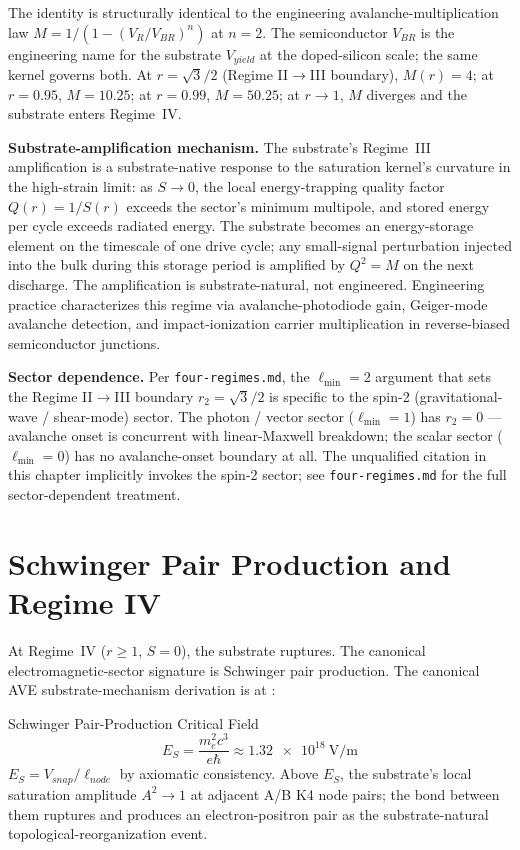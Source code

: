 The identity is structurally identical to the engineering avalanche-multiplication law $M = 1/(1 - (V_R/V_{BR})^n)$ at $n = 2$. The semiconductor $V_{BR}$ is the engineering name for the substrate $V_{yield}$ at the doped-silicon scale; the same kernel governs both. At $r = \sqrt{3}/2$ (Regime II$\to$III boundary), $M(r) = 4$; at $r = 0.95$, $M = 10.25$; at $r = 0.99$, $M = 50.25$; at $r \to 1$, $M$ diverges and the substrate enters Regime~IV.

\textbf{Substrate-amplification mechanism.} The substrate's Regime~III amplification is a substrate-native response to the saturation kernel's curvature in the high-strain limit: as $S \to 0$, the local energy-trapping quality factor $Q(r) = 1/S(r)$ exceeds the sector's minimum multipole, and stored energy per cycle exceeds radiated energy. The substrate becomes an energy-storage element on the timescale of one drive cycle; any small-signal perturbation injected into the bulk during this storage period is amplified by $Q^2 = M$ on the next discharge. The amplification is substrate-natural, not engineered. Engineering practice characterizes this regime via avalanche-photodiode gain, Geiger-mode avalanche detection, and impact-ionization carrier multiplication in reverse-biased semiconductor junctions.

\textbf{Sector dependence.} Per \texttt{four-regimes.md}, the $\ell_{\min} = 2$ argument that sets the Regime II$\to$III boundary $r_2 = \sqrt{3}/2$ is specific to the spin-2 (gravitational-wave / shear-mode) sector. The photon / vector sector ($\ell_{\min} = 1$) has $r_2 = 0$ --- avalanche onset is concurrent with linear-Maxwell breakdown; the scalar sector ($\ell_{\min} = 0$) has no avalanche-onset boundary at all. The unqualified citation in this chapter implicitly invokes the spin-2 sector; see \texttt{four-regimes.md} for the full sector-dependent treatment.

\section{Schwinger Pair Production and Regime IV}
\label{sec:vol9_schwinger_regime_iv}

At Regime~IV ($r \ge 1$, $S = 0$), the substrate ruptures. The canonical electromagnetic-sector signature is Schwinger pair production. The canonical AVE substrate-mechanism derivation is at :

\begin{resultbox}{Schwinger Pair-Production Critical Field}
\begin{equation}
    \boxed{E_S = \frac{m_e^2 c^3}{e\hbar} \approx \qty{1.32e18}{\volt\per\metre}}
    \label{eq:vol9_schwinger_field}
\end{equation}
$E_S = V_{snap}/\ell_{node}$ by axiomatic consistency. Above $E_S$, the substrate's local saturation amplitude $A^2 \to 1$ at adjacent A/B K4 node pairs; the bond between them ruptures and produces an electron-positron pair as the substrate-natural topological-reorganization event.
\end{resultbox}

